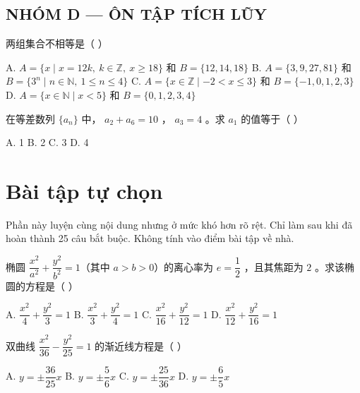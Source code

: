 \documentclass[11pt, a4paper]{article}
\begin{document}
\subsection*{NHÓM D — ÔN TẬP TÍCH LŨY}

\begin{baitap}[24]
两组集合不相等是（ ）
\par\vspace{3pt}
\noindent A. $A=\{x\mid x=12k,\ k\in\mathbb{Z},\ x\ge18\}$ 和 $B=\{12,14,18\}$ \quad B. $A=\{3,9,27,81\}$ 和 $B=\{3^n\mid n\in\mathbb{N},\ 1\le n\le4\}$ \quad C. $A=\{x\in\mathbb{Z}\mid -2<x\le3\}$ 和 $B=\{-1,0,1,2,3\}$ \quad D. $A=\{x\in\mathbb{N}\mid x<5\}$ 和 $B=\{0,1,2,3,4\}$
\end{baitap}

\begin{baitap}[25]
在等差数列 $\{a_n\}$ 中， $a_2 + a_6 = 10$ ， $a_3 = 4$ 。求 $a_1$ 的值等于（ ）
\par\vspace{3pt}
\noindent A. 1 \quad B. 2 \quad C. 3 \quad D. 4
\end{baitap}

\clearpage
\section{Bài tập tự chọn}

Phần này luyện cùng nội dung nhưng ở mức khó hơn rõ rệt. Chỉ làm sau khi đã hoàn thành 25 câu bắt buộc. Không tính vào điểm bài tập về nhà.

\begin{baitap}[1]
椭圆 $\dfrac{x^2}{a^2} + \dfrac{y^2}{b^2} = 1$（其中 $a > b > 0$）的离心率为 $e = \dfrac{1}{2}$ ，且其焦距为 $2$ 。求该椭圆的方程是（ ）
\par\vspace{3pt}
\noindent A. $\dfrac{x^2}{4} + \dfrac{y^2}{3} = 1$ \quad B. $\dfrac{x^2}{3} + \dfrac{y^2}{4} = 1$ \quad C. $\dfrac{x^2}{16} + \dfrac{y^2}{12} = 1$ \quad D. $\dfrac{x^2}{12} + \dfrac{y^2}{16} = 1$
\end{baitap}

\begin{baitap}[2]
双曲线 $\dfrac{x^2}{36} - \dfrac{y^2}{25} = 1$ 的渐近线方程是（ ）
\par\vspace{3pt}
\noindent A. $y = \pm\dfrac{36}{25}x$ \quad B. $y = \pm\dfrac{5}{6}x$ \quad C. $y = \pm\dfrac{25}{36}x$ \quad D. $y = \pm\dfrac{6}{5}x$
\end{baitap}
\end{document}
